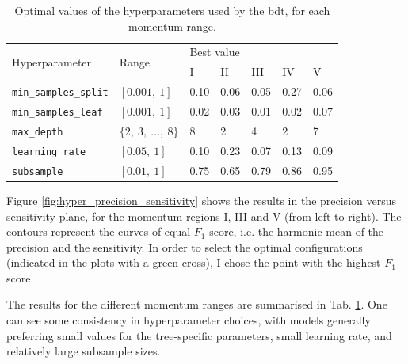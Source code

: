 \begin{table}[t]
	\caption{Optimal values of the hyperparameters used by the \gls{bdt}, for each momentum range.}
	\begin{center}
		\begin{small}
			\begin{tabular}{l|l|lllll}
				\multirow{2}{*}{Hyperparameter} & \multirow{2}{*}{Range} & \multicolumn{5}{l}{Best value}                           \\[1mm] \cline{3-7}
												&                        & \rule{0pt}{1.1\normalbaselineskip}I & II & III & IV & V \\[1mm]
												\hline
				\rule{0pt}{1.1\normalbaselineskip}\texttt{min_samples_split}      & $[0.001, ~1]$          & 0.10     & 0.06      & 0.05       & 0.27      & 0.06     \\[2mm]
				\texttt{min_samples_leaf}       & $[0.001, ~1]$          & 0.02     & 0.03      & 0.01       & 0.02      & 0.07     \\[2mm]
				\texttt{max_depth}              & $\{2, ~3, ~..., ~8\}$  & 8        & 2         & 4          & 2         & 7      \\[2mm]
				\texttt{learning_rate}          & $[0.05, ~1]$           & 0.10     & 0.23      & 0.07       & 0.13      & 0.09     \\[2mm]
				\texttt{subsample}              & $[0.01, ~1]$           & 0.75     & 0.65      & 0.79       & 0.86      & 0.95    
			\end{tabular}
		\end{small}
	\end{center}
	\label{tab:bdt_hyperpars}
\end{table}

Figure \ref{fig:hyper_precision_sensitivity} shows the results in the precision versus sensitivity plane, for the momentum regions I, III and V (from left to right). The contours represent the curves of equal $F_{1}$-score, i.e. the harmonic mean of the precision and the sensitivity. In order to select the optimal configurations (indicated in the plots with a green cross), I chose the point with the highest $F_{1}$-score.

The results for the different momentum ranges are summarised in Tab. \ref{tab:bdt_hyperpars}. One can see some consistency in hyperparameter choices, with models generally preferring small values for the tree-specific parameters, small learning rate, and relatively large subsample sizes.


